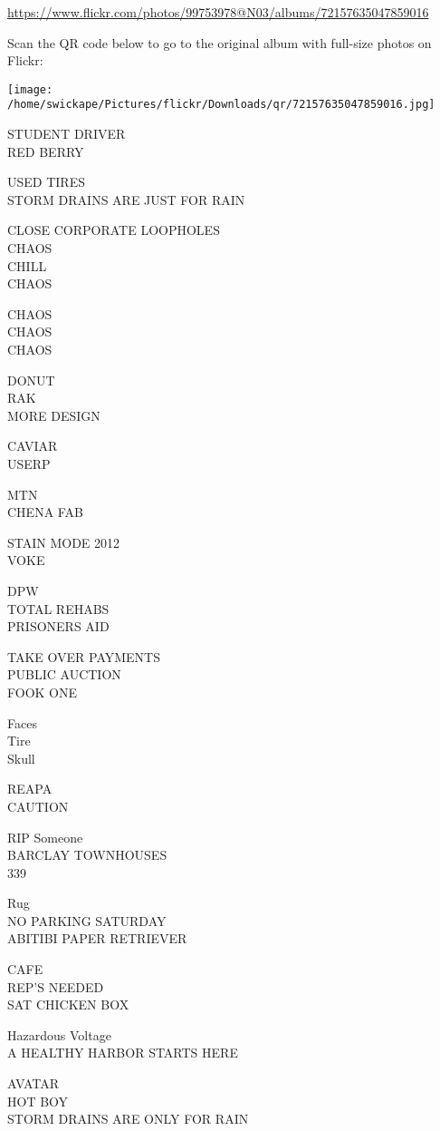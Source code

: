 \documentclass[10pt,letterpaper]{article}
\begin{document}
\url{https://www.flickr.com/photos/99753978@N03/albums/72157635047859016}

Scan the QR code below to go to the original album with full-size photos on Flickr:

\texttt{[image: /home/swickape/Pictures/flickr/Downloads/qr/72157635047859016.jpg]}


STUDENT DRIVER\\
RED BERRY

USED TIRES\\
STORM DRAINS ARE JUST FOR RAIN

CLOSE CORPORATE LOOPHOLES\\
CHAOS\\
CHILL\\
CHAOS

CHAOS\\
CHAOS\\
CHAOS

DONUT\\
RAK\\
MORE DESIGN

CAVIAR\\
USERP

MTN\\
CHENA FAB

STAIN MODE 2012\\
VOKE

DPW\\
TOTAL REHABS\\
PRISONERS AID

TAKE OVER PAYMENTS\\
PUBLIC AUCTION\\
FOOK ONE

Faces\\
Tire\\
Skull

REAPA\\
CAUTION

RIP Someone\\
BARCLAY TOWNHOUSES\\
339

Rug\\
NO PARKING SATURDAY\\
ABITIBI PAPER RETRIEVER

CAFE\\
REP'S NEEDED\\
SAT CHICKEN BOX

Hazardous Voltage\\
A HEALTHY HARBOR STARTS HERE

AVATAR\\
HOT BOY\\
STORM DRAINS ARE ONLY FOR RAIN
\end{document}
